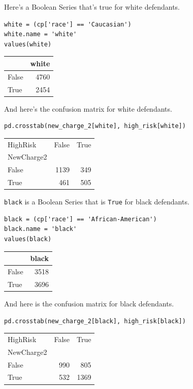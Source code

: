 Here's a Boolean Series that's true for white defendants.

\begin{lstlisting}[]
white = (cp['race'] == 'Caucasian')
white.name = 'white'
values(white)
\end{lstlisting}

\begin{tabular}{lr}
\midrule
{} &  white \\
\midrule
False &   4760 \\
True  &   2454 \\
\midrule
\end{tabular}

And here's the confusion matrix for white defendants.

\begin{lstlisting}[]
pd.crosstab(new_charge_2[white], high_risk[white])
\end{lstlisting}

\begin{tabular}{lrr}
\midrule
HighRisk &  False &  True  \\
NewCharge2 &        &        \\
\midrule
False      &   1139 &    349 \\
True       &    461 &    505 \\
\midrule
\end{tabular}

\passthrough{\lstinline!black!} is a Boolean Series that is
\passthrough{\lstinline!True!} for black defendants.

\begin{lstlisting}[]
black = (cp['race'] == 'African-American')
black.name = 'black'
values(black)
\end{lstlisting}

\begin{tabular}{lr}
\midrule
{} &  black \\
\midrule
False &   3518 \\
True  &   3696 \\
\midrule
\end{tabular}

And here is the confusion matrix for black defendants.

\begin{lstlisting}[]
pd.crosstab(new_charge_2[black], high_risk[black])
\end{lstlisting}

\begin{tabular}{lrr}
\midrule
HighRisk &  False &  True  \\
NewCharge2 &        &        \\
\midrule
False      &    990 &    805 \\
True       &    532 &   1369 \\
\midrule
\end{tabular}

